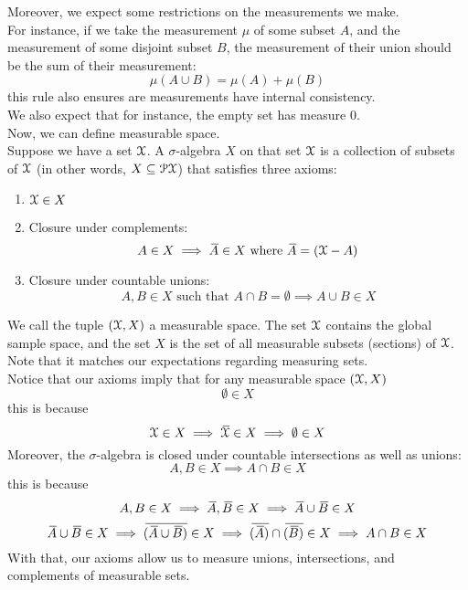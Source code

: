 \documentclass[12pt]{article}
\begin{document}
    Moreover, we expect some restrictions on the
    measurements we make. \\
    For instance, if we take the measurement $\mu$
    of some subset $A$, and the measurement
    of some disjoint subset $B$,
    the measurement of their union should
    be the sum of their measurement:
    \[ \mu(A \cup B) = \mu(A) + \mu(B) \]
    this rule also ensures are measurements
    have internal consistency. \\
    We also expect that for instance,
    the empty set has measure 0. \\

    Now, we can define measurable space. \\

    Suppose we have a set $\mathcal{X}$.
    A $\sigma$-algebra $X$ on that set $\mathcal{X}$
    is a collection of subsets of $\mathcal{X}$
    (in other words, $X \subseteq \mathcal{P}{\mathcal{X}}$)
    that satisfies three axioms:
    \begin{enumerate}
        \item 
        $\mathcal{X} \in X$
        \item 
        Closure under complements:
        \[A \in X \implies \,\overline{\!{A}} \in X
        \text{ where } \,\overline{\!{A}} = (\mathcal{X} - A) \]
        \item 
        Closure under countable unions:
        \[A, B \in X \text{ such that }
        A \cap B = \emptyset
        \implies A \cup B \in X \]
    \end{enumerate}
    We call the tuple $(\mathcal{X}, X)$ a measurable space.
    The set $\mathcal{X}$ contains the global sample space,
    and the set $X$ is the set of all measurable
    subsets (sections) of $\mathcal{X}$. \\
    Note that it matches our expectations regarding
    measuring sets. \\

    Notice that our axioms imply that
    for any measurable space $(\mathcal{X}, X)$
    \[ \emptyset \in X \]
    this is because
    \[ \mathcal{X} \in X \implies \,\overline{\!{\mathcal{X}}} \in X 
    \implies \emptyset \in X\]
    Moreover, the $\sigma$-algebra is closed
    under countable intersections as well as unions:
    \[ A, B \in X \implies A \cap B \in X \]
    this is because
    \[ A, B \in X \implies \,\overline{\!{A}}, \,\overline{\!{B}} \in X 
    \implies \,\overline{\!{A}} \cup \,\overline{\!{B}} \in X \] 
    \[ \olsi{A} \cup \olsi{B} \in X
    \implies \olsi{(\olsi{A} \cup \olsi{B})} \in X
    \implies \olsi{(\olsi{A})} 
    \cap \olsi{(\olsi{B})} \in X 
    \implies A \cap B \in X \]
    With that, our axioms allow us to measure
    unions, intersections, and complements
    of measurable sets. \\
\end{document}
